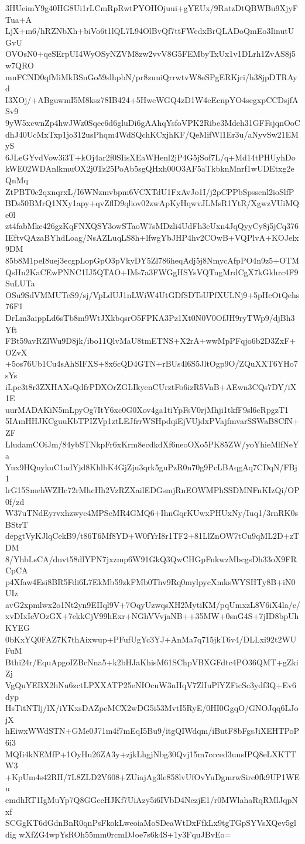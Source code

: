 3HUeimY9g40HG8Ui1rLCmRpRwtPYOHOjuui+gYEUx/9RatzDtQBWBu9XjyFTua+A
LjX+m6/hRZNbXh+biVo6t1lQL7L94OlBvQf7ttFWcdxBrQLADoQmEo3IinutUGvU
OVOsN0+qeSErpUI4WyOSyNZVM8zw2vvV8G5FEMbyTxUx1v1DLrh1ZvAS8j5w7QRO
mnFCND0qfMiMkBSnGo59slhpbN/pr8zuuiQrrwtvW8eSPgERKjri/h38jpDTRAyd
I3XOj/+ABguwmI5M8ksz78IB424+5HwcWGQ4zD1W4eEcnpYO4segxpCCDsjfASv9
9yW5xcwnZp4hwJWz0Sqee6d6gluDi6gAAhqYsfoVPK2Ribe3Mdeh31GFFsjqnOoC
dhJ40UcMxTxp1jo312usPhqm4WdSQchKCxjhKF/QeMifWl1Er3u/aNyvSw21EMyS
6JLeGYvdVow3i3T+kOj4ar2f0SIisXEaWHenl2jP4G5jSof7L/q+Md14tPHUyhDo
kWE02WDAnlkmuOX2j0Tz25PoAb5sgQHxh00O3AF5aTkbknMnrf1wUDEtxg2eQnMq
ZtPBT0e2qxnqrxL/I6WNzmvbpm6VCXTdU1FxAvJo1I/j2pCPPbSpsscnl2ioSlfP
BDs50BMrQ1NXy1apy+qvZflD9qliov02zwApKyHqwvJLMsR1YtR/XgwzVUiMQe0l
zt4fabMke426gzKqFNXQSY3owSTaoW7sMDzli4UdFh3eUxn4JqQyyCy8j5jCq376
IEftvQAzaBYhdLoag/NsAZLuqLS8h+lfwgYbJHP4hv2COwB+VQPlvA+KOJelx9DM
85b8M1peI8uej3ecgpLopGpO3pVkyDY5Zl786heqAdj5j8NmycAfpPO4n9z5+OTM
QsHn2KaCEwPNNC1IJ5QTAO+IMs7a3FWGgHSYsVQTngMrdCgX7kGkhrc4F9SuLUTa
OSu9SdVMMUTeS9/sj/VpLdUJ1nLWiW4UtGDfSDTsUPfXULNj9+5pHcOtQehs76F1
DrLm3aippLd6sTb8m9WtJXkbqsrO5FPKA3Pz1Xt0N0V0OfJH9ryTWp9/djBh3Yft
FBt59avRZlWu9D8jk/ibo11QlvMaU8tmETNS+X2rA+wwMpPFqjo6b2D3ZxF+OZvX
+5os76Ub1Cu4sAhSIFXS+8x6cQD4GTN+rBUs4l6S5JltOgp9O/ZQuXXT6YHo7sYs
iLpc3t8r3ZXHAXsQdfrPDXOrZGLIkyenCUrztFo6izR5VnB+AEwn3CQs7DY/iX1E
uurMADAKiN5mLpyOg7ItY6xc0G0Xov4ga1tiYpFsV0rjMhji1tkfF9sl6cRpgzT1
5IAmHHJKCguuKbTPIZVp1ztLEJfrrWSHpdqiEjVUjdxPVajfmvarSSWaB8CfN+ZF
LludamCOiJm/84ybSTNkpFr6xKrm8ecdkdXf6neoOXo5PK85ZW/yoYhieMlfNeYa
Ynx9HQnykuC1adYjd8KhlbK4GjZju3qrk5guPzR0n70g9PcLBAqgAq7CDqN/FBj1
lrG15SmehWZHc72rMhcHh2VzRZXailEDGsmjRnEOWMPhSSDMNFnKIzQi/OP0f/zd
W37uTNdEyrvxhzwyc4MPSeMR4GMQ6+IhnGqrKUwxPHUxNy/Iuq1/3rnRK0sBStrT
depgtVyKJlqCekB9/t86T6Mf8YD+W0fYrI8r1TF2+81LlZnOW7tCu9qML2D+zTDM
8/YhbLsCA/dnvt58dlYPN7jxzmp6W91GkQ3QwCHGpFnkwzMbcgsDh33oX9FRCpCA
p4Xfaw4Esi8BR5Fdi6L7EkMb59zkFMb0Thv9Rq0mylpycXmksWYSHTy8B+iN0UIz
avG2xpmlwx2o1Nt2yn9EIIql9V+7OqyUzwqsXH2MytiKM/pqUmxzL8V6iX4la/c/
xvDIxIeVOzGX+7ekkCjV99hExr+NGhVVvjaNB++35MW+0snG4S+7jID8bpUhKYEG
0bKxYQ0FAZ7K7thAixwup+PFufUgYc3YJ+AnMa7q715jkT6v4/DLLxi92t2WUFuM
Bthi24r/EquApgoIZBcNna5+k2bHJaKhisM61SChpVBXGFdtc4PO36QMT+gZkiZj
VgQuYEBX2hNu6zctLPXXATP25eNIOcuW3nHqV7ZlIuPlYZFicSc3ydf3Q+Ev6dyp
HsTitNTlj/lX/iYKxsDAZpcMCX2wDG5i53MvtI5RyE/0HI0GgqO/GNOJqq6LJojX
hEiwxWWdSTN+GMe0J71m4f7mEqI5Bu9/itgQIWdqm/iButF8bFgsJiXEHTPoP6i3
MQIi4kNEMfP+1OyHu26ZA3y+zjkLhgjNbg30Qvj15m7ccced3unsIPQ8eLXKTTW3
+KpUm4s42RH/7L8ZLD2V608+ZUiajAg3le858lvUfOvYuDgmrwSire0fk9UP1WEu
emdhRT1IgMuYp7Q8GGccHJKf7UiAzy5i6IVbD4NezjE1/r0MWlahaRqRMlJqpNxf
SCGgKT6dGdnBnR0qnPsFkokLweoiaMoSDeaWtDxFfkLx9tgTGpSYVsXQev5gldig
wXfZG4wpYsROh55mm0rcmDJoe7s6k4S+1y3FquJBvEo=
